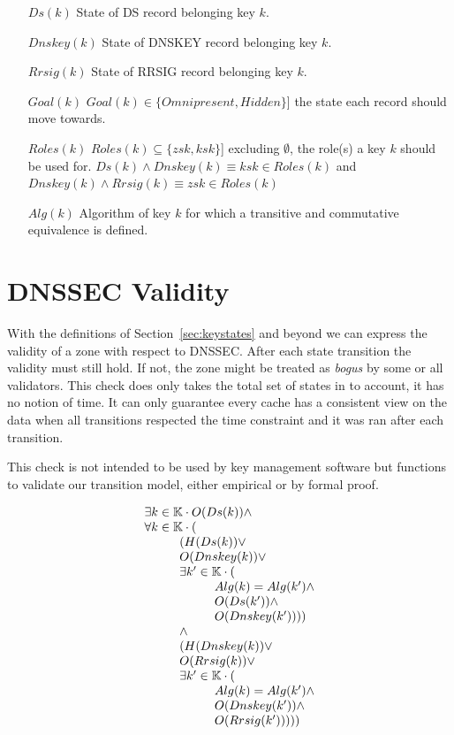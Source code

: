 \documentclass[twoside,english, a4paper]{article}
\begin{document}
\begin{itemize}
	\item[$Ds(k)$] State of DS record belonging key $k$.
	\item[$Dnskey(k)$] State of DNSKEY record belonging key $k$.
	\item[$Rrsig(k)$] State of RRSIG record belonging key $k$.
	\item[$Goal(k)$] $Goal(k) \in \{Omnipresent, Hidden\}$] the state each record
		should move towards.
	\item[$Roles(k)$] $Roles(k) \subseteq \{zsk,ksk\}$] excluding $\emptyset$, the 
		role(s) a key $k$ should be used for.
		$Ds(k) \wedge Dnskey(k) \equiv ksk \in Roles(k)$ and
		$Dnskey(k) \wedge Rrsig(k) \equiv zsk \in Roles(k)$
	\item[$Alg(k)$] Algorithm of key $k$ for which a transitive and 
		commutative equivalence is defined.
\end{itemize}

\section{DNSSEC Validity} \label{validity}

With the definitions of Section~\ref{sec:keystates} and beyond we can
express the validity of a zone with respect to DNSSEC. After each state
transition the validity must still hold. If not, the zone might be treated as
\emph{bogus} by some or all validators. This check does only takes the 
total set of states in to account, it has no notion of time. It can
only guarantee every cache has a consistent view on the data when all
transitions respected the time constraint and it was ran after each
transition.

This check is not intended to be used by key management software but
functions to validate our transition model, either empirical or by 
formal proof.

\begin{equation}
\begin{array}{l}
				\exists k \in \mathbb{K} \cdot O(Ds(k))
				\wedge \\
				\forall k \in \mathbb{K} \cdot (\\
\hskip 1cm			(H(Ds(k)) \vee \\
\hskip 1cm			O(Dnskey(k)) \vee \\
\hskip 1cm				\exists k' \in \mathbb{K} \cdot (\\
\hskip 2cm				Alg(k) = Alg(k') \wedge \\
\hskip 2cm				O(Ds(k')) \wedge \\
\hskip 2cm				O(Dnskey(k')) )) \\
\hskip 1cm			\wedge\\
\hskip 1cm			(H(Dnskey(k)) \vee \\
\hskip 1cm			O(Rrsig(k)) \vee \\
\hskip 1cm			\exists k' \in \mathbb{K} \cdot (\\
\hskip 2cm				Alg(k) = Alg(k') \wedge \\
\hskip 2cm				O(Dnskey(k')) \wedge \\
\hskip 2cm				O(Rrsig(k')) )))
\end{array}
\end{equation}
\end{document}
